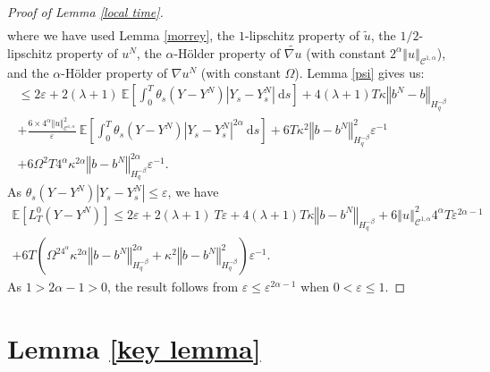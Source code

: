 \documentclass[11pt]{enstaPRE}
\newcommand{\norme}[1]{\left\Vert #1\right\Vert}
\newcommand{\E}{\mathbb{E}}
\newcommand{\di}{\mathrm{d}}
\begin{document}
\begin{proof}[Proof of Lemma \ref{local time}]
\begin{multline*}
    \end{multline*}
    where we have used Lemma \ref{morrey}, the $1$-lipschitz property of $\widetilde{u}$, the $1/2$-lipschitz property of $u^N$, the $\alpha$-Hölder property of $\widetilde{\nabla u}$ (with constant $2^\alpha\norme{u}_{\mathcal{C}^{1,\alpha}}$), and the $\alpha$-Hölder property of $\nabla u^N$ (with constant $\Omega$). Lemma \ref{psi} gives us:
    \begin{multline*}
    \leq 2\varepsilon + 2(\lambda + 1)\ \E\left[\int_0^T\theta_s\left(Y-Y^N\right)\left|Y_s - Y^N_s\right|\ \di s \right] + 4(\lambda + 1)T\kappa\norme{b^N-b}_{H^{-\beta}_{q}} \\  
    +\frac{6\times4^{\alpha}\norme{u}_{\mathcal{C}^{1,\alpha}}^2}{\varepsilon}\ \E\left[\int_0^T \theta_s\left(Y-Y^N\right)\left|Y_s - Y^N_s\right|^{2\alpha}\ \di s\right]+ 6T\kappa^2\norme{b-b^N}_{H^{-\beta}_{q}}^2\varepsilon^{-1}\\   + 6\Omega^2T4^{\alpha}\kappa^{2\alpha} \norme{b-b^N}_{H^{-\beta}_q}^{2\alpha}\varepsilon^{-1}.
    \end{multline*}
    As $\theta_s(Y-Y^N)\left|Y_s - Y^N_s\right|\leq \varepsilon$, we have    
    \begin{multline*}
    \E\left[L^0_T(Y-Y^N)\right]\leq 2\varepsilon + 2(\lambda + 1)\ T\varepsilon
    +4(\lambda + 1)T\kappa\norme{b-b^N}_{H^{-\beta}_{q}}+6\norme{u}_{\mathcal{C}^{1,\alpha}}^2 4^{\alpha}T \varepsilon^{2\alpha-1} \\ + 6T\left(\Omega^24^{\alpha}\kappa^{2\alpha} \norme{b-b^N}_{H^{-\beta}_q}^{2\alpha}+\kappa^2\norme{b-b^N}_{H^{-\beta}_{q}}^2\right)\varepsilon^{-1}.
    \end{multline*}    
    As $1>2\alpha-1>0$, the result follows from $\varepsilon\leq\varepsilon^{2\alpha-1}$ when $0<\varepsilon\leq1$.  
    
\end{proof} 

\section{Lemma \ref{key lemma}}
\end{document}
